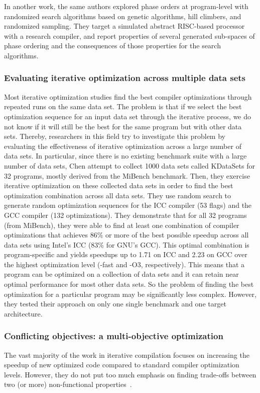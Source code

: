 In another work\cite{cooper2006exploring}, the same authors explored phase orders at program-level with randomized search algorithms based on genetic algorithms, hill climbers, and randomized sampling. They target a simulated abstract RISC-based processor with a research compiler, and report properties of several generated sub-spaces of phase ordering and the consequences of those properties for the search algorithms.

\subsubsection{Evaluating iterative optimization across multiple data sets}
Most iterative optimization studies find the best compiler optimizations through repeated runs on the same data set. The problem is that if we select the best optimization sequence for an input data set through the iterative process, we do not know if it will still be the best for the same program but with other data sets. Thereby, researchers in this field try to investigate this problem by evaluating the effectiveness of iterative optimization across a large number of data sets. In particular, since there is no existing benchmark suite with a large number of data sets, Chen \etal\cite{chen2010evaluating} attempt to collect 1000 data sets called KDataSets for 32 programs, mostly derived from the MiBench benchmark. Then, they exercise iterative optimization on these collected data sets in order to find the best optimization combination across all data sets. 
They use random search to generate random optimization sequences for the ICC compiler (53 flags) and the GCC compiler (132 optimizations).
They demonstrate that for all 32 programs (from MiBench), they were able to find at least one combination of compiler optimizations that achieves 86\% or more of the best possible speedup across all data sets using Intel’s ICC (83\% for GNU’s GCC). This optimal combination is program-specific and yields speedups up to 1.71 on ICC and 2.23 on GCC over the highest optimization level (-fast and -O3, respectively). This means that a program can be optimized on a collection of data sets and it can retain near optimal performance for most other data sets. So the problem of finding the best optimization for a particular program may be significantly less complex. However, they tested their approach on only one single benchmark and one target architecture.




\subsubsection{Conflicting objectives: a multi-objective optimization}
The vast majority of the work in iterative compilation focuses on increasing the speedup of new optimized code compared to standard compiler optimization levels. However, they do not put too much emphasis on finding trade-offs between two (or more) non-functional properties~\cite{almagor2004finding,hoste2008cole,pan2006fast,pallister2015identifying,chen2012deconstructing,martins2014exploration,lin2008automatic,martinez2014multi}.

